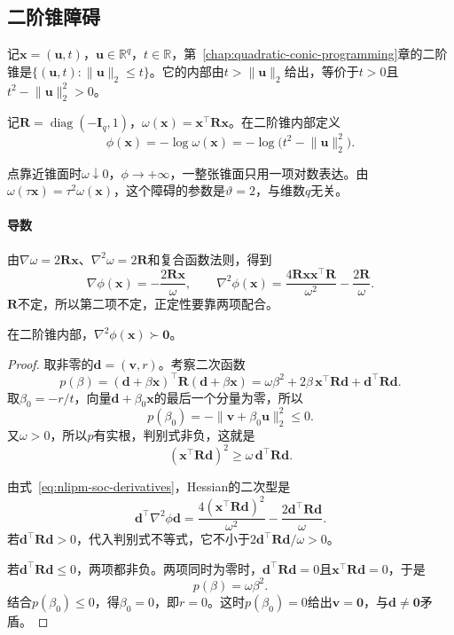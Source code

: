 \subsection{二阶锥障碍}
\label{sec:nlipm-soc}

记$\bm{x}=(\bm{u},t)$，$\bm{u}\in\mathbb{R}^{q}$，$t\in\mathbb{R}$，第~\ref{chap:quadratic-conic-programming}章的二阶锥是$\{(\bm{u},t):\lVert\bm{u}\rVert_2\leq t\}$。它的内部由$t>\lVert\bm{u}\rVert_2$给出，等价于$t>0$且$t^2-\lVert\bm{u}\rVert_2^2>0$。

\begin{definition}[二阶锥障碍]
\label{def:nlipm-soc-barrier}
记$\bm{R}=\operatorname{diag}(-\bm{I}_q,1)$，$\omega(\bm{x})=\bm{x}^\top\bm{R}\bm{x}$。在二阶锥内部定义
\begin{equation}
 \phi(\bm{x})=-\log\omega(\bm{x})=-\log\bigl(t^2-\lVert\bm{u}\rVert_2^2\bigr).
 \label{eq:nlipm-soc-barrier}
\end{equation}
\end{definition}

点靠近锥面时$\omega\downarrow0$，$\phi\to+\infty$，一整张锥面只用一项对数表达。由$\omega(\tau\bm{x})=\tau^2\omega(\bm{x})$，这个障碍的参数是$\vartheta=2$，与维数$q$无关。

\paragraph{导数}
由$\nabla\omega=2\bm{R}\bm{x}$、$\nabla^2\omega=2\bm{R}$和复合函数法则，得到
\begin{equation}
 \nabla\phi(\bm{x})=-\frac{2\bm{R}\bm{x}}{\omega},\qquad
 \nabla^2\phi(\bm{x})=\frac{4\bm{R}\bm{x}\bm{x}^\top\bm{R}}{\omega^2}-\frac{2\bm{R}}{\omega}.
 \label{eq:nlipm-soc-derivatives}
\end{equation}
$\bm{R}$不定，所以第二项不定，正定性要靠两项配合。

\begin{lemma}[二阶锥障碍的Hessian正定]
\label{lem:nlipm-soc-pd}
在二阶锥内部，$\nabla^2\phi(\bm{x})\succ\bm{0}$。
\end{lemma}

\begin{proof}
取非零的$\bm{d}=(\bm{v},r)$。考察二次函数
\[
 p(\beta)=(\bm{d}+\beta\bm{x})^\top\bm{R}(\bm{d}+\beta\bm{x})=\omega\beta^2+2\beta\,\bm{x}^\top\bm{R}\bm{d}+\bm{d}^\top\bm{R}\bm{d}.
\]
取$\beta_0=-r/t$，向量$\bm{d}+\beta_0\bm{x}$的最后一个分量为零，所以
\[
 p(\beta_0)=-\lVert\bm{v}+\beta_0\bm{u}\rVert_2^2\leq0.
\]
又$\omega>0$，所以$p$有实根，判别式非负，这就是
\[
 (\bm{x}^\top\bm{R}\bm{d})^2\geq\omega\,\bm{d}^\top\bm{R}\bm{d}.
\]

由式~\eqref{eq:nlipm-soc-derivatives}，Hessian的二次型是
\[
 \bm{d}^\top\nabla^2\phi\bm{d}=\frac{4(\bm{x}^\top\bm{R}\bm{d})^2}{\omega^2}-\frac{2\bm{d}^\top\bm{R}\bm{d}}{\omega}.
\]
若$\bm{d}^\top\bm{R}\bm{d}>0$，代入判别式不等式，它不小于$2\bm{d}^\top\bm{R}\bm{d}/\omega>0$。

若$\bm{d}^\top\bm{R}\bm{d}\leq0$，两项都非负。两项同时为零时，$\bm{d}^\top\bm{R}\bm{d}=0$且$\bm{x}^\top\bm{R}\bm{d}=0$，于是
\[
 p(\beta)=\omega\beta^2.
\]
结合$p(\beta_0)\leq0$，得$\beta_0=0$，即$r=0$。这时$p(\beta_0)=0$给出$\bm{v}=\bm{0}$，与$\bm{d}\neq\bm{0}$矛盾。
\end{proof}

